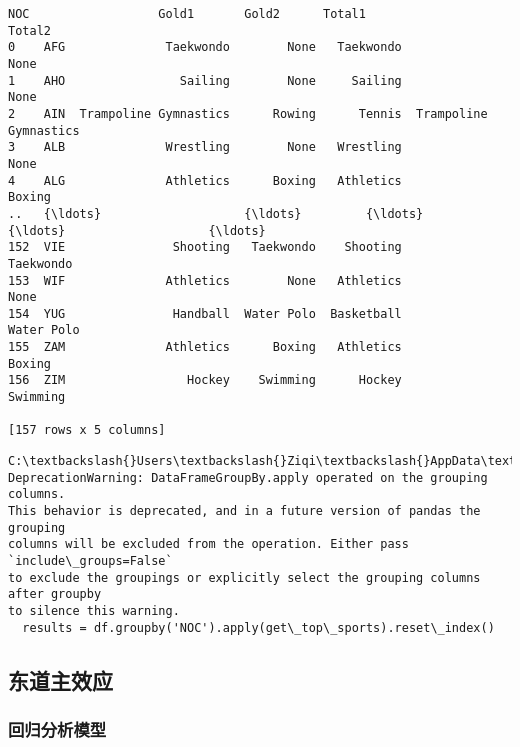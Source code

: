 \documentclass[11pt]{article}
\begin{document}
    \begin{Verbatim}[commandchars=\\\{\}]
     NOC                  Gold1       Gold2      Total1                 Total2
0    AFG              Taekwondo        None   Taekwondo                   None
1    AHO                Sailing        None     Sailing                   None
2    AIN  Trampoline Gymnastics      Rowing      Tennis  Trampoline Gymnastics
3    ALB              Wrestling        None   Wrestling                   None
4    ALG              Athletics      Boxing   Athletics                 Boxing
..   {\ldots}                    {\ldots}         {\ldots}         {\ldots}                    {\ldots}
152  VIE               Shooting   Taekwondo    Shooting              Taekwondo
153  WIF              Athletics        None   Athletics                   None
154  YUG               Handball  Water Polo  Basketball             Water Polo
155  ZAM              Athletics      Boxing   Athletics                 Boxing
156  ZIM                 Hockey    Swimming      Hockey               Swimming

[157 rows x 5 columns]
    \end{Verbatim}

    \begin{Verbatim}[commandchars=\\\{\}]
C:\textbackslash{}Users\textbackslash{}Ziqi\textbackslash{}AppData\textbackslash{}Local\textbackslash{}Temp\textbackslash{}ipykernel\_20880\textbackslash{}3729593612.py:31:
DeprecationWarning: DataFrameGroupBy.apply operated on the grouping columns.
This behavior is deprecated, and in a future version of pandas the grouping
columns will be excluded from the operation. Either pass `include\_groups=False`
to exclude the groupings or explicitly select the grouping columns after groupby
to silence this warning.
  results = df.groupby('NOC').apply(get\_top\_sports).reset\_index()
    \end{Verbatim}

    \subsection{东道主效应}\label{ux4e1cux9053ux4e3bux6548ux5e94}

    \subsubsection{回归分析模型}\label{ux56deux5f52ux5206ux6790ux6a21ux578b}
\end{document}
